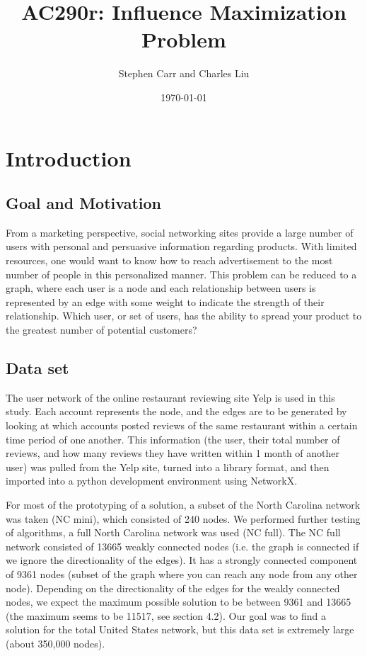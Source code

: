 \documentclass{article}
\begin{document}
	\title{AC290r: Influence Maximization Problem}
	\author{Stephen Carr and Charles Liu}
	\date{\today}
	\maketitle
	
	\section{Introduction}
	
	\subsection{Goal and Motivation}
	
	From a marketing perspective, social networking sites provide a large number of users with personal and persuasive information regarding products. With limited resources, one would want to know how to reach advertisement to the most number of people in this personalized manner. This problem can be reduced to a graph, where each user is a node and each relationship between users is represented by an edge with some weight to indicate the strength of their relationship. Which user, or set of users, has the ability to spread your product to the greatest number of potential customers?
	
	\subsection{Data set}
	
	The user network of the online restaurant reviewing site Yelp is used in this study. Each account represents the node, and the edges are to be generated by looking at which accounts posted reviews of the same restaurant within a certain time period of one another. This information (the user, their total number of reviews, and how many reviews they have written within 1 month of another user) was pulled from the Yelp site, turned into a library format, and then imported into a python development environment using NetworkX. 
	
	For most of the prototyping of a solution, a subset of the North Carolina network was taken (NC mini), which consisted of 240 nodes. We performed further testing of algorithms, a full North Carolina network was used (NC full). The NC full network consisted of 13665 weakly connected nodes (i.e. the graph is connected if we ignore the directionality of the edges). It has a strongly connected component of 9361 nodes (subset of the graph where you can reach any node from any other node). Depending on the directionality of the edges for the weakly connected nodes, we expect the maximum possible solution to be between 9361 and 13665 (the maximum seems to be 11517, see section 4.2). Our goal was to find a solution for the total United States network, but this data set is extremely large (about 350,000 nodes).
	
\end{document}
